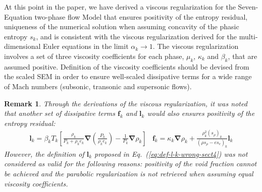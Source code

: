 \documentclass[preprint,10pt]{elsarticle}
\newcommand{\grad}{\mbold{\nabla}}
\newcommand{\mbold}[1]{\boldsymbol#1}
\newtheorem*{remark}{Remark}
\newcommand{\eqt}[1]{Eq.~(\ref{#1})}                     %
\begin{document}
%
At this point in the paper, we have derived a viscous regularization for the Seven-Equation two-phase flow Model that ensures positivity of the entropy residual, uniqueness of the numerical solution when assuming concavity of the phasic entropy $s_k$, and is consistent with the viscous regularization derived for the multi-dimensional Euler equations \cite{jlg, Marco_paper_low_mach} in the limit $\alpha_k \to 1$. The viscous regularization involves a set of three viscosity coefficients for each phase, $\mu_k$, $\kappa_k$ and $\beta_k$, that are assumed positive. Definition of the viscosity coefficients should be devised from the scaled SEM in order to ensure well-scaled dissipative terms for a wide range of Mach numbers (subsonic, transonic and supersonic flows).
%
\begin{remark}
Through the derivations of the viscous regularization, it was noted that another set of dissipative terms $\mbold f_k$ and $\mbold l_k$ would also ensures positivity of the entropy residual:
%
\begin{subequations}
\begin{align}\label{eq:def-l-k-wrong-sect4}
\mbold l_k =\beta_k T_k \left[ \frac{\rho_k}{P_k+\rho_k e_k} \grad \left( \frac{P_k}{\rho_k e_k} \right) - \frac{1}{P_k} \grad \rho_k \right]
\end{align}
\begin{align}
\mbold f_k = \kappa_k \grad \rho_k +  \frac{\rho^2_k (s_{\rho})_k}{\left( \rho s_{\rho} - e s_e \right)_k} \mbold l_k
\end{align}
\end{subequations}
%
However, the definition of $\mbold l_k$ proposed in \eqt{eq:def-l-k-wrong-sect4} was not considered as valid for the following reasons: positivity of the void fraction cannot be achieved and the parabolic regularization is not retrieved when assuming equal viscosity coefficients.
\end{remark}
%
\end{document}
